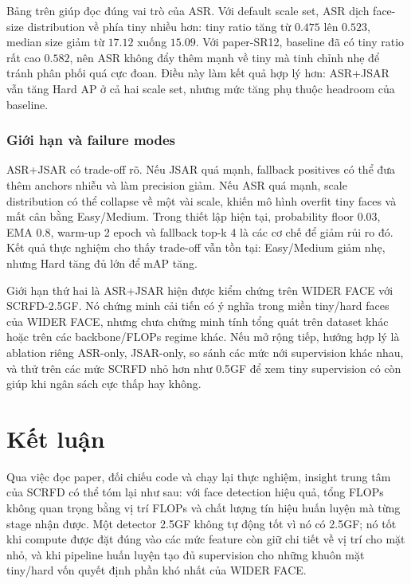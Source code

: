 Bảng trên giúp đọc đúng vai trò của ASR. Với default scale set, ASR dịch face-size distribution về phía tiny nhiều hơn: tiny ratio tăng từ \(0.475\) lên \(0.523\), median size giảm từ \(17.12\) xuống \(15.09\). Với paper-SR12, baseline đã có tiny ratio rất cao \(0.582\), nên ASR không đẩy thêm mạnh về tiny mà tinh chỉnh nhẹ để tránh phân phối quá cực đoan. Điều này làm kết quả hợp lý hơn: ASR+JSAR vẫn tăng Hard AP ở cả hai scale set, nhưng mức tăng phụ thuộc headroom của baseline.

\subsection{Giới hạn và failure modes}

ASR+JSAR có trade-off rõ. Nếu JSAR quá mạnh, fallback positives có thể đưa thêm anchors nhiễu và làm precision giảm. Nếu ASR quá mạnh, scale distribution có thể collapse về một vài scale, khiến mô hình overfit tiny faces và mất cân bằng Easy/Medium. Trong thiết lập hiện tại, probability floor \(0.03\), EMA \(0.8\), warm-up 2 epoch và fallback top-k 4 là các cơ chế để giảm rủi ro đó. Kết quả thực nghiệm cho thấy trade-off vẫn tồn tại: Easy/Medium giảm nhẹ, nhưng Hard tăng đủ lớn để mAP tăng.

Giới hạn thứ hai là ASR+JSAR hiện được kiểm chứng trên WIDER FACE với SCRFD-2.5GF. Nó chứng minh cải tiến có ý nghĩa trong miền tiny/hard faces của WIDER FACE, nhưng chưa chứng minh tính tổng quát trên dataset khác hoặc trên các backbone/FLOPs regime khác. Nếu mở rộng tiếp, hướng hợp lý là ablation riêng ASR-only, JSAR-only, so sánh các mức nới supervision khác nhau, và thử trên các mức SCRFD nhỏ hơn như 0.5GF để xem tiny supervision có còn giúp khi ngân sách cực thấp hay không.


\chapter{Kết luận}

Qua việc đọc paper, đối chiếu code và chạy lại thực nghiệm, insight trung tâm của SCRFD có thể tóm lại như sau: với face detection hiệu quả, tổng FLOPs không quan trọng bằng vị trí FLOPs và chất lượng tín hiệu huấn luyện mà từng stage nhận được. Một detector 2.5GF không tự động tốt vì nó có 2.5GF; nó tốt khi compute được đặt đúng vào các mức feature còn giữ chi tiết về vị trí cho mặt nhỏ, và khi pipeline huấn luyện tạo đủ supervision cho những khuôn mặt tiny/hard vốn quyết định phần khó nhất của WIDER FACE.

